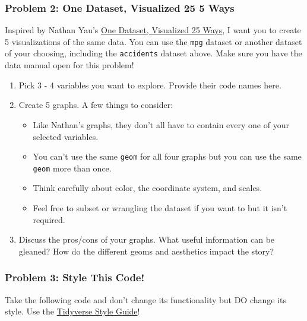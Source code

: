 \documentclass[
]{article}
\providecommand{\tightlist}{%
  \setlength{\itemsep}{0pt}\setlength{\parskip}{0pt}}
\begin{document}
\hypertarget{problem-2-one-dataset-visualized-25-5-ways}{%
\subsubsection{\texorpdfstring{Problem 2: One Dataset, Visualized
\st{25} 5
Ways}{Problem 2: One Dataset, Visualized 25 5 Ways}}\label{problem-2-one-dataset-visualized-25-5-ways}}

Inspired by Nathan Yau's
\href{https://flowingdata.com/2017/01/24/one-dataset-visualized-25-ways/}{One
Dataset, Visualized 25 Ways}, I want you to create 5 visualizations of
the same data. You can use the \texttt{mpg} dataset or another dataset
of your choosing, including the \texttt{accidents} dataset above. Make
sure you have the data manual open for this problem!

\begin{enumerate}
\def\labelenumi{\alph{enumi}.}
\item
  Pick 3 - 4 variables you want to explore. Provide their code names
  here.
\item
  Create 5 graphs. A few things to consider:

  \begin{itemize}
  \tightlist
  \item
    Like Nathan's graphs, they don't all have to contain every one of
    your selected variables.
  \item
    You can't use the same \texttt{geom} for all four graphs but you can
    use the same \texttt{geom} more than once.
  \item
    Think carefully about color, the coordinate system, and scales.
  \item
    Feel free to subset or wrangling the dataset if you want to but it
    isn't required.
  \end{itemize}
\item
  Discuss the pros/cons of your graphs. What useful information can be
  gleaned? How do the different geoms and aesthetics impact the story?
\end{enumerate}

\hypertarget{problem-3-style-this-code}{%
\subsubsection{Problem 3: Style This
Code!}\label{problem-3-style-this-code}}

Take the following code and don't change its functionality but DO change
its style. Use the \href{https://style.tidyverse.org/}{Tidyverse Style
Guide}!
\end{document}
